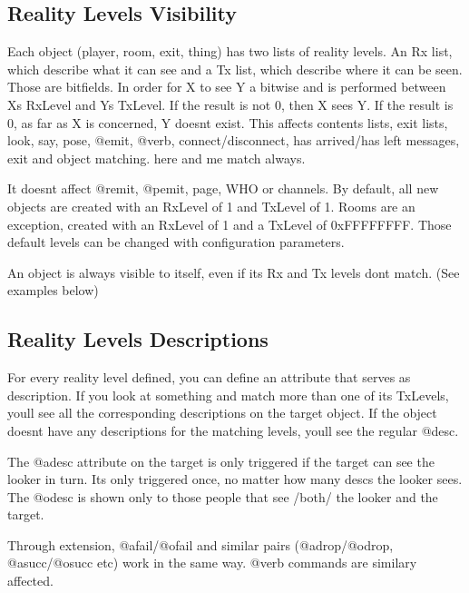 \documentclass[letterpaper,10pt,english]{sphinxmanual}
\begin{document}
\subsection{Reality Levels Visibility}
\label{\detokenize{advanced:reality-levels-visibility}}
\sphinxAtStartPar
Each object (player, room, exit, thing) has two lists of reality levels.
An Rx list, which describe what it can see and a Tx list, which describe
where it can be seen. Those are bitfields. In order for X to see Y a bitwise
\textquotesingle{}and\textquotesingle{} is performed between X\textquotesingle{}s RxLevel and Y\textquotesingle{}s TxLevel. If the result is not
0, then X sees Y. If the result is 0, as far as X is concerned, Y doesn\textquotesingle{}t
exist. This affects contents lists, exit lists, look, say, pose, @emit,
@verb, connect/disconnect, has arrived/has left messages, exit and object
matching. \textquotesingle{}here\textquotesingle{} and \textquotesingle{}me\textquotesingle{} match always.

\sphinxAtStartPar
It doesn\textquotesingle{}t affect @remit, @pemit, page, WHO or channels.
By default, all new objects are created with an RxLevel of 1 and TxLevel of
1. Rooms are an exception, created with an RxLevel of 1 and a TxLevel of
0xFFFFFFFF. Those default levels can be changed with configuration
parameters.

\sphinxAtStartPar
An object is always visible to itself, even if its Rx and Tx levels don\textquotesingle{}t
match. (See examples below)


\subsection{Reality Levels Descriptions}
\label{\detokenize{advanced:reality-levels-descriptions}}
\sphinxAtStartPar
For every reality level defined, you can define an attribute that serves as
description. If you look at something and match more than one of its
TxLevels, you\textquotesingle{}ll see all the corresponding descriptions on the target
object. If the object doesn\textquotesingle{}t have any descriptions for the matching levels,
you\textquotesingle{}ll see the regular @desc.

\sphinxAtStartPar
The @adesc attribute on the target is only triggered if the target can see
the looker in turn. It\textquotesingle{}s only triggered once, no matter how many descs the
looker sees. The @odesc is shown only to those people that see /both/ the
looker and the target.

\sphinxAtStartPar
Through extension, @afail/@ofail and similar pairs (@adrop/@odrop,
@asucc/@osucc etc) work in the same way. @verb commands are similary
affected.
\end{document}
